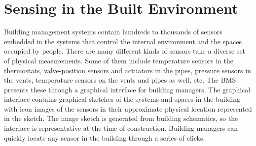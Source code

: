 \chapter{Sensing in the Built Environment}
\label{chap:SensingInBuiltMain}


Building management systems contain hundreds to thousands of sensors embedded in the systems that control the internal environment and
the spaces occupied by people.  There are many different kinds of sensors take a diverse set of physical measurements.
Some of them include temperature sensors in the thermostats,
valve-position sensors and actuators in the pipes, pressure sensors in the vents, temperature sensors on the vents and pipes as well, etc.
The BMS presents these through a graphical interface for building managers.  The graphical interface contains graphical sketches
of the systems and spaces in the building with icon images of the sensors in their approximate physical location represented
in the sketch.  The image sketch is generated from building schematics, so the interface is representative at the time of construction.
Building managers can quickly locate any sensor in the building through a series of clicks.


